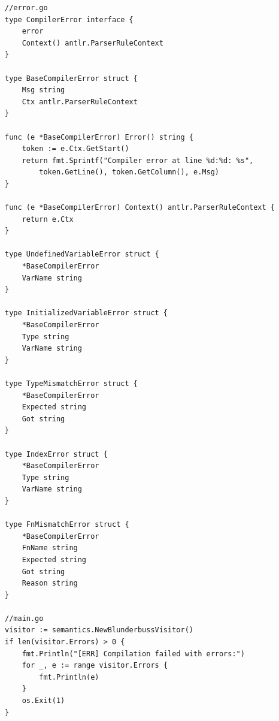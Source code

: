 \begin{lstlisting}[caption={Definicja błędów kompilatora}, label={lst:err-compiler}, morekeywords={type, string, error, nil, func}]
//error.go
type CompilerError interface {
	error
	Context() antlr.ParserRuleContext
}

type BaseCompilerError struct {
	Msg string
	Ctx antlr.ParserRuleContext
}

func (e *BaseCompilerError) Error() string {
	token := e.Ctx.GetStart()
	return fmt.Sprintf("Compiler error at line %d:%d: %s", 
		token.GetLine(), token.GetColumn(), e.Msg)
}

func (e *BaseCompilerError) Context() antlr.ParserRuleContext {
	return e.Ctx
}

type UndefinedVariableError struct {
	*BaseCompilerError
	VarName string
}

type InitializedVariableError struct {
	*BaseCompilerError
	Type string
	VarName string
}

type TypeMismatchError struct {
    *BaseCompilerError
    Expected string
    Got string
}

type IndexError struct {
	*BaseCompilerError
	Type string
	VarName string
}

type FnMismatchError struct {
	*BaseCompilerError
	FnName string
	Expected string
	Got string
	Reason string
}

//main.go
visitor := semantics.NewBlunderbussVisitor()
if len(visitor.Errors) > 0 {
	fmt.Println("[ERR] Compilation failed with errors:")
	for _, e := range visitor.Errors {
		fmt.Println(e)
	}
	os.Exit(1)
}
\end{lstlisting}

